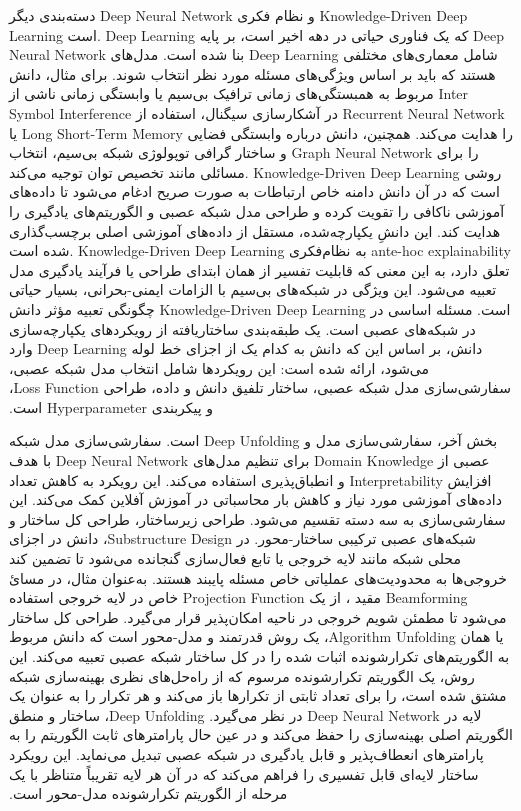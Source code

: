 دسته‌بندی دیگر 
\gls{Deep Neural Network}
 و نظام فکری 
\gls{Knowledge-Driven Deep Learning}‬
است. 
\gls{Deep Learning}
که یک فناوری حیاتی در دهه اخیر است، بر پایه 
\gls{Deep Neural Network}
 بنا شده است. مدل‌های 
\gls{Deep Learning}
  شامل معماری‌های مختلفی هستند که باید بر اساس ویژگی‌های مسئله مورد نظر انتخاب شوند. برای مثال، دانش مربوط به همبستگی‌های زمانی ترافیک بی‌سیم یا وابستگی زمانی ناشی از 
\gls{Inter Symbol Interference}
   در آشکارسازی سیگنال، استفاده از 
\gls{Recurrent Neural Network}
    یا 
\gls{Long Short-Term Memory}
    را هدایت می‌کند. همچنین، دانش درباره وابستگی فضایی و ساختار گرافی توپولوژی شبکه بی‌سیم، انتخاب 
\gls{Graph Neural Network}
     را برای مسائلی مانند تخصیص توان توجیه می‌کند.‬
\gls{Knowledge-Driven Deep Learning}
 روشی است که در آن دانش دامنه خاص ارتباطات به صورت صریح ادغام می‌شود تا داده‌های آموزشی ناکافی را تقویت کرده و طراحی مدل شبکه عصبی و الگوریتم‌های یادگیری را هدایت کند. این دانشِ یکپارچه‌شده، مستقل از داده‌های آموزشی اصلی برچسب‌گذاری شده است. 
\gls{Knowledge-Driven Deep Learning}
  به نظام‌فکری 
\gls{ante-hoc explainability}
   تعلق دارد، به این معنی که قابلیت تفسیر از همان ابتدای طراحی یا فرآیند یادگیری مدل تعبیه می‌شود. این ویژگی در شبکه‌های بی‌سیم با الزامات ایمنی-بحرانی، بسیار حیاتی است.‬
‫مسئله اساسی در 
\gls{Knowledge-Driven Deep Learning}
 چگونگی تعبیه مؤثر دانش در شبکه‌های عصبی است. یک طبقه‌بندی ساختاریافته از رویکردهای یکپارچه‌سازی دانش، بر اساس این که دانش به کدام یک از اجزای خط لوله 
\gls{Deep Learning}
  وارد می‌شود، ارائه شده است: این رویکردها شامل انتخاب مدل شبکه عصبی، سفارشی‌سازی مدل شبکه عصبی، ساختار تلفیق دانش و داده، طراحی 
\gls{Loss Function}،
   و پیکربندی 
\gls{Hyperparameter}   
    است.‬
    
‫بخش آخر، سفارشی‌سازی مدل و 
\gls{Deep Unfolding}
است.
‫سفارشی‌سازی مدل شبکه عصبی از 
\gls{Domain Knowledge}
 برای تنظیم مدل‌های 
\gls{Deep Neural Network}
 با هدف افزایش 
\gls{Interpretability}
  و انطباق‌پذیری استفاده می‌کند. این رویکرد به کاهش تعداد داده‌های آموزشی مورد نیاز و کاهش بار محاسباتی در آموزش آفلاین کمک می‌کند. این سفارشی‌سازی به سه دسته تقسیم می‌شود. طراحی زیرساختار، طراحی کل ساختار و شبکه‌های عصبی ترکیبی ساختار-محور.‬
‫در 
\gls{Substructure Design}،
 دانش در اجزای محلی شبکه مانند لایه خروجی یا تابع فعال‌سازی گنجانده می‌شود تا تضمین کند خروجی‌ها به محدودیت‌های عملیاتی خاص مسئله پایبند هستند. به‌عنوان مثال، در مسائ 
\gls{Beamforming}
  مقید 
،
 از یک 
\gls{Projection Function}
  خاص در لایه خروجی استفاده می‌شود تا مطمئن شویم خروجی در ناحیه امکان‌پذیر قرار می‌گیرد.‬
‫طراحی کل ساختار یا همان 
\gls{Algorithm Unfolding}،
 یک روش قدرتمند و مدل-محور است که دانش مربوط به الگوریتم‌های تکرارشونده اثبات شده را در کل ساختار شبکه عصبی تعبیه می‌کند. این روش، یک الگوریتم تکرارشونده مرسوم که از راه‌حل‌های نظری بهینه‌سازی شبکه مشتق شده است، را برای تعداد ثابتی از تکرارها باز می‌کند و هر تکرار را به عنوان یک لایه در 
\gls{Deep Neural Network}
  در نظر می‌گیرد.‬
\gls{Deep Unfolding}،
 ساختار و منطق الگوریتم اصلی بهینه‌سازی را حفظ می‌کند و در عین حال پارامترهای ثابت الگوریتم را به پارامترهای انعطاف‌پذیر و قابل یادگیری در شبکه عصبی تبدیل می‌نماید. این رویکرد ساختار لایه‌ای قابل تفسیری را فراهم می‌کند که در آن هر لایه تقریباً متناظر با یک مرحله از الگوریتم تکرارشونده مدل-محور است.‬
 

